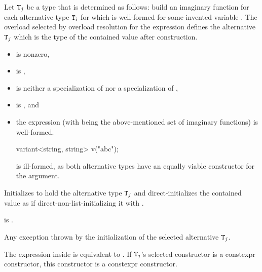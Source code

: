 \begin{itemdescr}
\pnum
Let $\texttt{T}_j$ be a type that is determined as follows:
build an imaginary function 
for each alternative type $\texttt{T}_i$
for which  
is well-formed for some invented variable .
The overload  selected by overload
resolution for the expression  defines
the alternative $\texttt{T}_j$ which is the type of the contained value after
construction.

\pnum
\constraints
\begin{itemize}
\item
{} is nonzero,

\item
{} is ,

\item
{} is neither
a specialization of  nor
a specialization of ,

\item
{} is , and

\item
the expression \brk{}
(with  being the above-mentioned set of
imaginary functions) is well-formed.
\begin{note}
\begin{codeblock}
variant<string, string> v("abc");
\end{codeblock}
is ill-formed, as both alternative types have an equally viable constructor
for the argument.
\end{note}
\end{itemize}

\pnum
\effects
Initializes  to hold the alternative type $\texttt{T}_j$ and
direct-initializes the contained value as if direct-non-list-initializing it
with .

\pnum
\ensures
{} is .

\pnum
\throws
Any exception thrown by the initialization of the selected alternative $\texttt{T}_j$.

\pnum
\remarks
The expression inside  is equivalent to
.
If $\texttt{T}_j$'s selected constructor is a constexpr constructor,
this constructor is a constexpr constructor.
\end{itemdescr}

